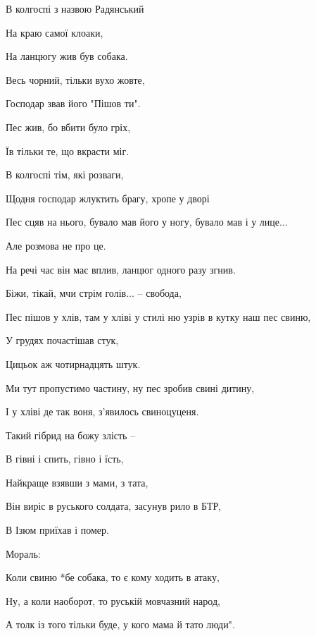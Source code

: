 В колгоспі з назвою Радянський

На краю самої клоаки,

На ланцюгу жив був собака.

Весь чорний, тільки вухо жовте,

Господар звав його "Пішов ти".

Пес жив, бо вбити було гріх,

Їв тільки те, що вкрасти міг.

В колгоспі тім, які розваги,

Щодня господар жлуктить брагу, хропе у дворі

Пес сцяв на нього, бувало мав його у ногу, бувало мав і у лице...

Але розмова не про це.

На речі час він має вплив, ланцюг одного разу згнив.

Біжи, тікай, мчи стрім голів... – свобода,

Пес пішов у хлів, там у хліві у стилі ню узрів в кутку наш пес свиню,

У грудях почастішав стук,

Цицьок аж чотирнадцять штук.

Ми тут пропустимо частину, ну пес зробив свині дитину,

І у хліві де так воня, з'явилось свиноцуценя.

Такий гібрид на божу злість –

В гівні і спить, гівно і їсть,

Найкраще взявши з мами, з тата,

Він виріс в руського солдата, засунув рило в БТР,

В Ізюм приїхав і помер.

Мораль:

Коли свиню *бе собака, то є кому ходить в атаку,

Ну, а коли наоборот, то руській мовчазний народ,

А толк із того тільки буде, у кого мама й тато люди".
